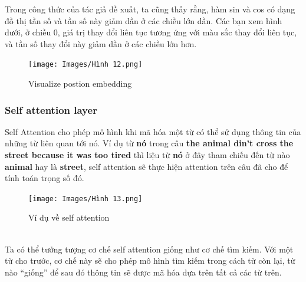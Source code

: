\documentclass[a4paper]{article}
\theoremstyle{definition}
\begin{document}
Trong công thức của tác giả đề xuất, ta cũng thấy rằng, hàm sin và cos có dạng đồ thị tần số và tần số này giảm dần ở các chiều lớn dần. Các bạn xem hình dưới, ở chiều 0, giá trị thay đổi liên tục tương ứng với màu sắc thay đổi liên tục, và tần số thay đổi này giảm dần ở các chiều lớn hơn.
\begin{figure}[h!]
\begin{center}
\texttt{[image: Images/Hình 12.png]} \\[0.25in]

\caption{Visualize postion embedding}
\end{center}
\end{figure}

\subsubsection{Self attention layer }

Self Attention cho phép mô hình khi mã hóa một từ có thể sử dụng thông tin của những từ liên quan tới nó. Ví dụ từ \textbf{nó} trong câu \textbf{the animal din't cross the street because it was too tired}
thì liệu từ \textbf{nó} ở đây tham chiếu đến từ nào \textbf{animal} hay là \textbf{street}, self attention sẽ thực hiện attention trên câu đã cho để tính toán trọng số đó. 
\begin{figure}[h!]
\begin{center}
\texttt{[image: Images/Hình 13.png]} \\[0.25in]

\caption{Ví dụ về self attention}
\end{center}
\end{figure}
\\
Ta có thể tưởng tượng cơ chế self attention giống như cơ chế tìm kiếm. Với một từ cho trước, cơ chế này sẽ cho phép mô hình tìm kiếm trong cách từ còn lại, từ nào “giống” để sau đó thông tin sẽ được mã hóa dựa trên tất cả các từ trên.
\end{document}
